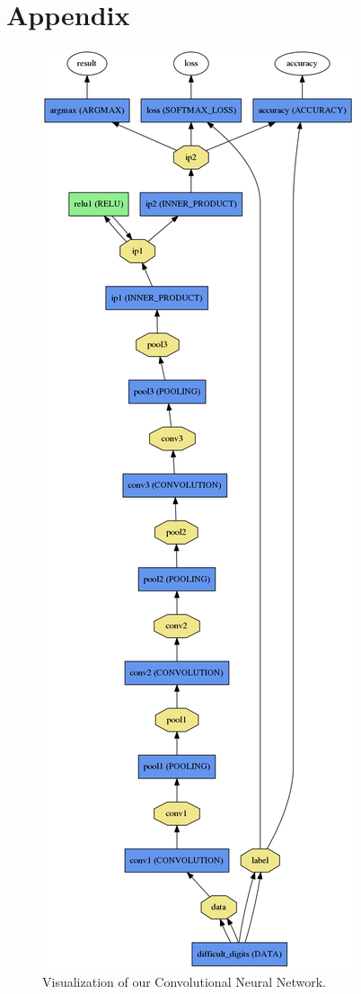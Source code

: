 \documentclass[10pt,twocolumn]{article}
\begin{document}
\section*{Appendix}
\begin{figure}
\includegraphics[scale=0.30]{./nn.png}
\caption{Visualization of our Convolutional Neural Network.}
\end{figure}
\end{document}
